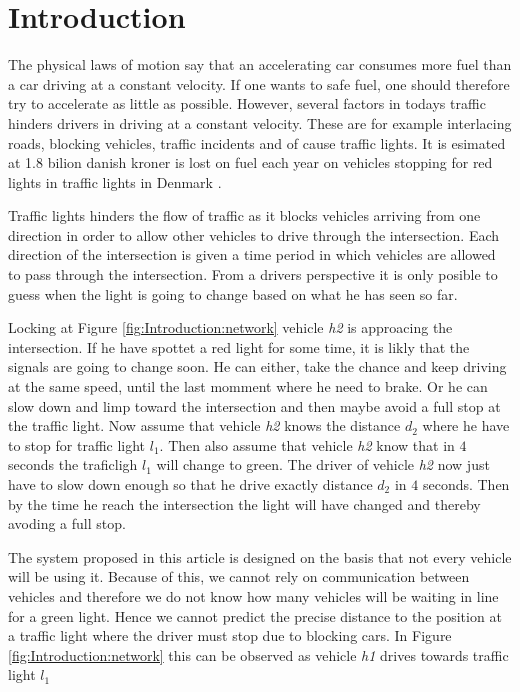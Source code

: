 \section{Introduction}

The physical laws of motion say that an accelerating car consumes more fuel than a car driving at a constant velocity. %
If one wants to safe fuel, one should therefore try to accelerate as little as possible. 
However, several factors in todays traffic hinders drivers in driving at a constant velocity. 
These are for example interlacing roads, blocking vehicles, traffic incidents and of cause traffic lights. 
It is esimated at 1.8 bilion danish kroner is lost on fuel each year on vehicles stopping for red lights in traffic lights in Denmark \cite{Vejdir}.

Traffic lights hinders the flow of traffic as it blocks vehicles arriving from one direction in order to allow other vehicles to drive through the intersection.
Each direction of the intersection is given a time period in which vehicles are allowed to pass through the intersection. 
From a drivers perspective it is only posible to guess when the light is going to change based on what he has seen so far. 

Locking at Figure \ref{fig:Introduction:network} vehicle \textit{h2} is approacing the intersection. If he have spottet a red light for some time, it is likly that the signals are going to change soon. He can either, take the chance and keep driving at the same speed, until the last momment where he need to brake. Or he can slow down and limp toward the intersection and then maybe avoid a full stop at the traffic light. Now assume that vehicle \textit{h2} knows the distance $d_2$ where he have to stop for traffic light $l_1$. Then also assume that vehicle \textit{h2} know that in $4$ seconds the traficligh $l_1$ will change to green. The driver of vehicle \textit{h2} now just have to slow down enough so that he drive exactly distance $d_2$ in $4$ seconds. Then by the time he reach the intersection the light will have changed and thereby avoding a full stop.

The system proposed in this article is designed on the basis that not every vehicle will be using it. 
Because of this, we cannot rely on communication between vehicles and therefore we do not know how many vehicles will be waiting in line for a green light. %
Hence we cannot predict the precise distance to the position at a traffic light where the driver must stop due to blocking cars. In Figure \ref{fig:Introduction:network} this can be observed as vehicle \textit{h1} drives towards traffic light $l_1$


